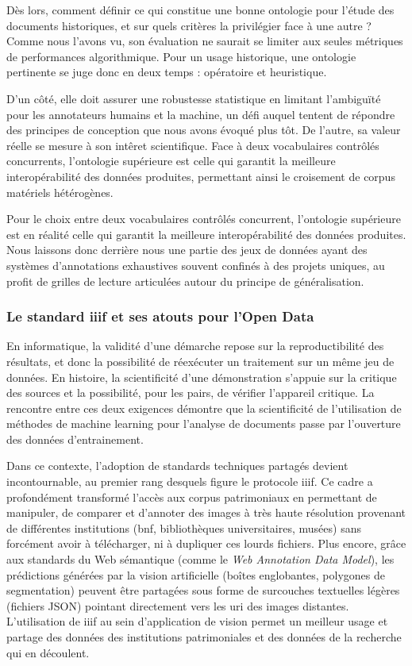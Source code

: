 Dès lors, comment définir ce qui constitue une \og bonne \fg{} ontologie pour l'étude des documents historiques, et sur quels critères la privilégier face à une autre ? Comme nous l'avons vu, son évaluation ne saurait se limiter aux seules métriques de performances algorithmique. Pour un usage historique, une ontologie pertinente se juge donc en deux temps : opératoire et heuristique.

D'un côté, elle doit assurer une robustesse statistique en limitant l'ambiguïté pour les annotateurs humains et la machine, un défi auquel tentent de répondre des principes de conception que nous avons évoqué plus tôt. De l'autre, sa valeur réelle se mesure à son intêret scientifique. Face à deux vocabulaires contrôlés concurrents, l'ontologie supérieure est celle qui garantit la meilleure interopérabilité des données produites, permettant ainsi le croisement de corpus matériels hétérogènes.

Pour le choix entre deux vocabulaires contrôlés concurrent, l'ontologie supérieure est en réalité celle qui garantit la meilleure interopérabilité des données produites. Nous laissons donc derrière nous une partie des jeux de données ayant des systèmes d'annotations exhaustives souvent confinés à des projets uniques, au profit de grilles de lecture articulées autour du principe de généralisation. 

\subsubsection{Le standard \gls{iiif} et ses atouts pour l'Open Data}

En informatique, la validité d'une démarche repose sur la reproductibilité des résultats, et donc la possibilité de réexécuter un traitement sur un même jeu de données. En histoire, la scientificité d'une démonstration s'appuie sur la critique des sources et la possibilité, pour les pairs, de vérifier l'appareil critique. La rencontre entre ces deux exigences démontre que la scientificité de l'utilisation de méthodes de machine learning pour l'analyse de documents passe par l'ouverture des données d'entrainement.

Dans ce contexte, l'adoption de standards techniques partagés devient incontournable, au premier rang desquels figure le protocole \gls{iiif}. Ce cadre a profondément transformé l'accès aux corpus patrimoniaux en permettant de manipuler, de comparer et d'annoter des images à très haute résolution provenant de différentes institutions (\gls{bnf}, bibliothèques universitaires, musées) sans forcément avoir à télécharger, ni à dupliquer ces lourds fichiers. Plus encore, grâce aux standards du Web sémantique (comme le \textit{Web Annotation Data Model}), les prédictions générées par la vision artificielle (boîtes englobantes, polygones de segmentation) peuvent être partagées sous forme de surcouches textuelles légères (fichiers JSON) pointant directement vers les \gls{uri} des images distantes. L'utilisation de \gls{iiif} au sein d'application de vision permet un meilleur usage et partage des données des institutions patrimoniales et des données de la recherche qui en découlent. 


